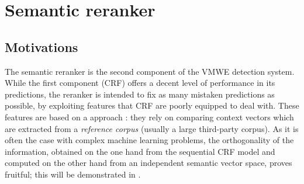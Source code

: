 \documentclass[output=paper
,modfonts
,nonflat]{langsci/langscibook}
\begin{document}






\section{\label{subsec:Sem}Semantic reranker}
\subsection{Motivations}

The semantic reranker
 is the second component of the VMWE detection
system. While the first component (CRF) offers a decent level of
performance in its predictions, the reranker is intended to fix as
many mistaken predictions as possible, by exploiting features that CRF
are poorly equipped to deal with. These features are based on a
 approach \citep{schutze1998,maldonado2011}:
they rely on comparing context vectors which are extracted from a {\em
  reference corpus} (usually a large third-party corpus). As it is
often the case with complex machine learning problems, the
orthogonality of the information, obtained on the one hand from the
sequential CRF model and computed on the other hand from an independent
semantic vector space, proves fruitful; this will be demonstrated in
.
\end{document}
